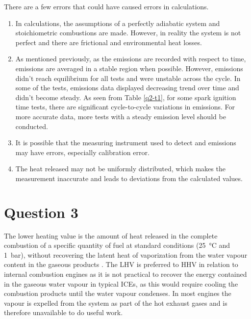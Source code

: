 \documentclass[11pt]{article}
\begin{document}
There are a few errors that could have caused errors in calculations.
\begin{enumerate}
    \item In calculations, the assumptions of a perfectly adiabatic system and stoichiometric combustions are made. However, in reality the system is not perfect and there are frictional and environmental heat losses. 
    \item As mentioned previously, as the emissions are recorded with respect to time, emissions are averaged in a stable region when possible. However, emissions didn’t reach equilibrium for all tests and were unstable across the cycle. In some of the tests, emissions data displayed decreasing trend over time and didn’t become steady. As seen from Table \ref{q2-t1}, for some spark ignition time tests, there are significant cycle-to-cycle variations in emissions. For more accurate data, more tests with a steady emission level should be conducted. 
    \item It is possible that the measuring instrument used to detect  and  emissions may have errors, especially calibration error.
    \item The heat released may not be uniformly distributed, which makes the measurement inaccurate and leads to deviations from the calculated values. 
\end{enumerate}
\section{Question 3}
The lower heating value is the amount of heat released in the complete combustion of a specific quantity of fuel at standard conditions (\SI{25}{\celsius} and \SI{1}{\bar}), without recovering the latent heat of vaporization from the water vapour content in the gaseous products \cite{q3-r1}. The LHV is preferred to HHV in relation to internal combustion engines as it is not practical to recover the energy contained in the gaseous water vapour in typical ICEs, as this would require cooling the combustion products until the water vapour condenses. In most engines the vapour is expelled from the system as part of the hot exhaust gases and is therefore unavailable to do useful work. 
\end{document}
